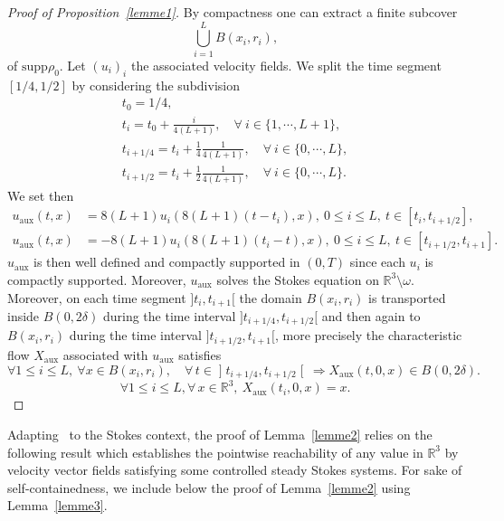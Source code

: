 \documentclass[10pt]{amsart}
\theoremstyle{definition}\newtheorem{defi}[theo]{Definition}\newtheorem{rema}[theo]{Remark}\newtheorem{exam}[theo]{Example}\newtheorem{exem}[theo]{Example}\newtheorem{nota}[theo]{Notation}
\newcommand{\supp}{\mathrm{supp} }
\newcommand{\aux}{\mathrm{aux}}
\newcommand{\R}{\mathbb{R}}
\renewcommand{\leq}{\leqslant}
\let\oldforall\forall
\renewcommand*{\forall}{\mathrel{\oldforall}}
\begin{document}
\begin{proof}[Proof of Proposition~\ref{lemme1}]
By compactness one can extract a finite subcover
\[
\underset{i=1}{\overset{L}{\bigcup}}B(x_i,r_i),
\]
of $\supp \rho_0$. Let $(u_i)_i$ the associated velocity fields. We split the time segment $[1/4,1/2]$ by considering the subdivision
\begin{gather*}
t_0=1/4, \\
t_i=t_0+ \frac{i}{4(L+1)}, \quad \forall\: i \in \{1, \cdots, L+1\},\\
t_{i+1/4}=t_i +\frac{1}{4} \frac{1}{4(L+1)}, \quad \forall\: i \in \{0, \cdots, L\}, \\
t_{i+1/2}=t_i +\frac{1}{2} \frac{1}{4(L+1)},\quad \forall\: i \in \{0, \cdots, L\}.
\end{gather*}
We set then
\begin{align*}
u_\aux(t,x)&=8(L+1)u_i(8(L+1)(t-t_{i}),x), \: 0 \leq i \leq L, \: t \in [t_{i},t_{i+1/2}],
\\ u_\aux(t,x)&=-8(L+1)u_i(8(L+1)(t_{i}-t),x), \: 0 \leq i \leq L, \: t \in [t_{i+1/2},t_{i+1}].
\end{align*}
$u_\aux$ is then well defined and compactly supported in $(0,T)$ since each $u_i$ is compactly supported. Moreover, $u_\aux$ solves the Stokes equation on $\R^3 \setminus \omega$. Moreover, on each time segment $]t_{i},t_{i+1}[$ the domain $B(x_i,r_i)$ is transported inside $B(0,2\delta)$ during the time interval $]t_{i+1/4},t_{i+1/2}[$ and then again to $B(x_i,r_i)$ during the time interval $]t_{i+1/2},t_{i+1}[$, more precisely the characteristic flow $X_\aux$ associated with $u_\aux$ satisfies
\begin{equation*}
\forall 1 \leq i \leq L,\: \forall x\in B(x_i, r_i), \quad \forall \, t \in\mathopen]t_{i+1/4},t_{i+1/2}\mathclose[\,\Rightarrow X_\aux(t,0,x)\in B(0,2\delta).
\end{equation*}
\[
\forall 1 \leq i \leq L,\forall \, x \in \R^3, \: X_\aux(t_{i},0,x)=x.
\]
\end{proof}



Adapting~\cite[Proposition~3.2.8]{G} to the Stokes context, the proof of Lemma~\ref{lemme2} relies on the following result which establishes the pointwise reachability of any value in $\R^3$ by velocity vector fields satisfying some controlled steady Stokes systems. For sake of self-containedness, we include below the proof of Lemma~\ref{lemme2} using Lemma~\ref{lemme3}.
\end{document}
